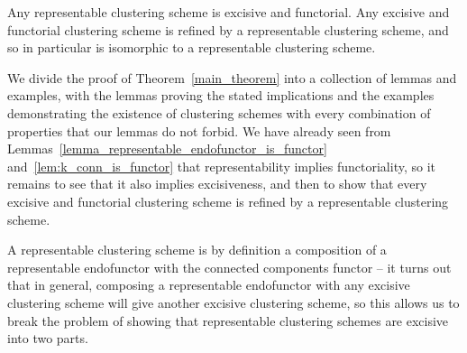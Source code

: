 \documentclass[a4paper,reqno,oneside]{article} %
\begin{document}
\begin{theorem} \label{main_theorem}
    Any representable clustering scheme is excisive and functorial. Any excisive and functorial clustering scheme is refined by a representable clustering scheme, and so in particular is isomorphic to a representable clustering scheme.
\end{theorem}

We divide the proof of Theorem~\ref{main_theorem} into a collection of lemmas and examples, with the lemmas proving the stated implications and the examples demonstrating the existence of clustering schemes with every combination of properties that our lemmas do not forbid. We have already seen from Lemmas~\ref{lemma_representable_endofunctor_is_functor} and~\ref{lem:k_conn_is_functor} that representability implies functoriality, so it remains to see that it also implies excisiveness, and then to show that every excisive and functorial clustering scheme is refined by a representable clustering scheme.

A representable clustering scheme is by definition a composition of a representable endofunctor with the connected components functor -- it turns out that in general, composing a representable endofunctor with any excisive clustering scheme will give another excisive clustering scheme, so this allows us to break the problem of showing that representable clustering schemes are excisive into two parts.
\end{document}
